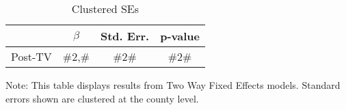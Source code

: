 \noindent 
\begin{table}[H]
\caption{Clustered SEs \label{tab:regression_cluster}}
\medskip{}

\begin{centering}
\begin{tabular}{cccc}
\hline 
 & $\beta$ & Std. Err. & p-value\tabularnewline
\hline 
Post-TV & \#2,\# & \#2\# & \#2\#\tabularnewline
\hline 
\end{tabular}
\par\end{centering}
\begin{centering}
\medskip{}
\par\end{centering}
{\footnotesize{}Note: This table displays results from Two Way Fixed Effects models. Standard errors shown are clustered at the county level.}{\footnotesize\par}
\end{table}